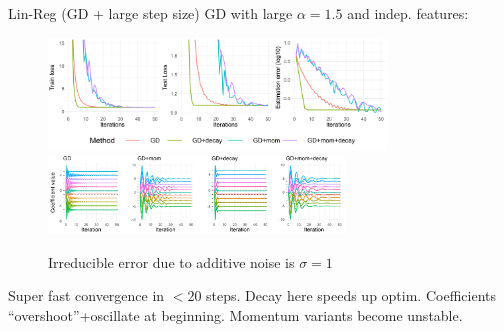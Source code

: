 \documentclass[11pt,compress,t,notes=noshow, xcolor=table]{beamer}
\begin{document}
\begin{vbframe}{Lin-Reg (GD + large step size)}
\vspace{-0.5cm}
GD with large $\alpha=1.5$ and indep. features:
\begin{figure}
            \includegraphics[width=0.8\textwidth]{slides/04-multivariate-first-order/figure_man/simu_linmod/GD_reg_large_lr_iters.pdf} \\
             \includegraphics[width=0.7\textwidth]{slides/04-multivariate-first-order/figure_man/simu_linmod/GD_reg_coef_large.pdf}\\
            \begin{footnotesize}
                Irreducible error due to additive noise is $\sigma=1$
            \end{footnotesize}
\end{figure}
Super fast convergence in $<20$ steps. Decay here speeds up optim. Coefficients ``overshoot''+oscillate at beginning. Momentum variants become unstable.
\end{vbframe}


\end{document}
